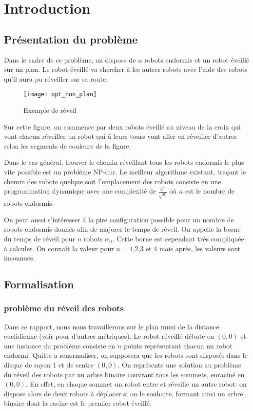 \section{Introduction}

\subsection{Présentation du problème}

Dans le cadre de ce problème, on dispose de $n$ robots endormis et un robot éveillé sur un plan. Le robot éveillé va chercher à les autres robots avec l'aide des robots qu'il aura pu réveiller sur sa route.

\begin{figure}[h!]
  \centering
  \texttt{[image: opt\_non\_plan]}
  \caption{Exemple de réveil}
  \label{fig:opt_non_plan}
\end{figure}

Sur cette figure, on commence par deux robots éveillé au niveau de la croix qui vont chacun réveiller un robot qui à leurs tours vont aller en réveiller d'autres selon les segments de couleurs de la figure.

Dans le cas général, trouver le chemin réveillant tous les robots endormis le plus vite possible est un problème NP-dur. Le meilleur algorithme existant, traçant le chemin des robots quelque soit l'emplacement des robots consiste en une programmation dynamique avec une complexité de $\frac{3^n}{\sqrt{n}}$ où $n$ est le nombre de robots endormis.

On peut aussi s'intéresser à la pire configuration possible pour un nombre de robots endormis donnés afin de majorer le temps de réveil. On appelle la borne du temps de réveil pour $n$ robots $\alpha_n$. Cette borne est cependant très compliquée à calculer. On connaît la valeur pour $n = 1$,$2$,$3$ et $4$ mais après, les valeurs sont inconnues.
\subsection{Formalisation}

\subsubsection{problème du réveil des robots}

Dans ce rapport, nous nous travaillerons sur le plan muni de la distance
euclidienne (voir \cite{} pour d'autres métriques). Le robot réveillé débute en
$(0,0)$ et une instance du problème consiste en $n$ points représentant chacun
un robot endormi. Quitte a renormaliser, on supposera que les robots sont
disposés dans le disque de rayon 1 et de centre $(0,0)$. On représente une
solution au problème du réveil des robots par un arbre binaire couvrant tous les
sommets, enraciné en $(0, 0)$. En effet, en chaque sommet un robot entre et
réveille un autre robot: on dispose alors de deux robots à déplacer si on le
souhaite, formant ainsi un arbre binaire dont la racine est le premier robot
éveillé.

